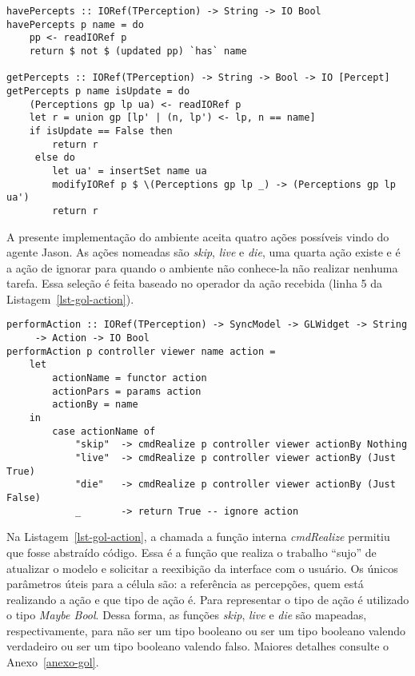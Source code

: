 \begin{center}
    \begin{minipage}{140mm}
	\begin{lstlisting}[frame=trbl, caption=Métodos para recuperar as percepções., label=lst-gol-testP]
havePercepts :: IORef(TPerception) -> String -> IO Bool
havePercepts p name = do
    pp <- readIORef p
    return $ not $ (updated pp) `has` name

getPercepts :: IORef(TPerception) -> String -> Bool -> IO [Percept]
getPercepts p name isUpdate = do
    (Perceptions gp lp ua) <- readIORef p
    let r = union gp [lp' | (n, lp') <- lp, n == name]
    if isUpdate == False then
        return r
     else do
        let ua' = insertSet name ua
        modifyIORef p $ \(Perceptions gp lp _) -> (Perceptions gp lp ua')
        return r
	\end{lstlisting}
    \end{minipage}
\end{center}

A presente implementação do ambiente aceita quatro ações possíveis vindo do
agente Jason. As ações nomeadas são \emph{skip}, \emph{live} e \emph{die}, uma
quarta ação existe e é a ação de ignorar para quando o ambiente não conhece-la não
realizar nenhuma tarefa. Essa seleção é feita baseado no operador da ação
recebida (linha 5 da Listagem~\ref{lst-gol-action}).

\lstset{linewidth=130mm}
\begin{center}
    \begin{minipage}{140mm}
	\begin{lstlisting}[frame=trbl, caption=Método que realiza ações., label=lst-gol-action]
performAction :: IORef(TPerception) -> SyncModel -> GLWidget -> String
     -> Action -> IO Bool
performAction p controller viewer name action =
    let
        actionName = functor action
        actionPars = params action
        actionBy = name
    in
        case actionName of
            "skip"  -> cmdRealize p controller viewer actionBy Nothing
            "live"  -> cmdRealize p controller viewer actionBy (Just True)
            "die"   -> cmdRealize p controller viewer actionBy (Just False)
            _       -> return True -- ignore action
	\end{lstlisting}
    \end{minipage}
\end{center}

Na Listagem~\ref{lst-gol-action}, a chamada a função interna \emph{cmdRealize}
permitiu que fosse abstraído código. Essa é a função que
realiza o trabalho ``sujo'' de atualizar o modelo e solicitar a reexibição da
interface com o usuário. Os únicos parâmetros úteis para a célula são: a
referência as percepções, quem está realizando a ação e que tipo de ação é.
Para representar o tipo de ação é utilizado o tipo \emph{Maybe Bool}. Dessa
forma, as funções \emph{skip}, \emph{live} e \emph{die} são mapeadas,
respectivamente, para não ser um tipo booleano ou ser um tipo booleano valendo
verdadeiro ou ser um tipo booleano valendo falso. Maiores detalhes consulte o
Anexo~\ref{anexo-gol}.

